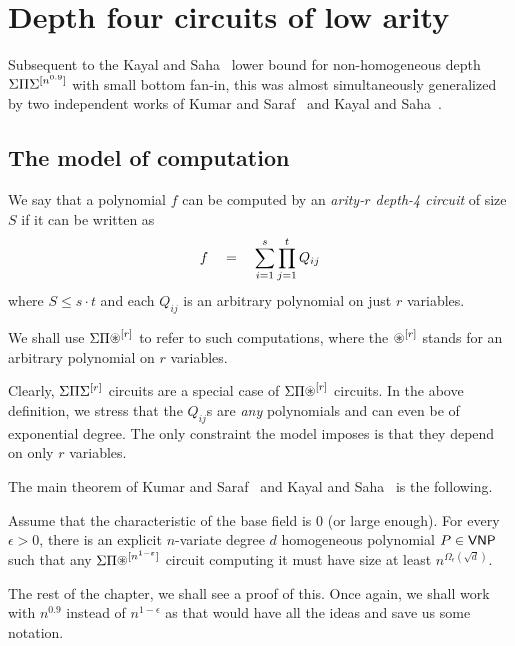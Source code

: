 \chapter{Depth four circuits of low arity}
\label{chap:d4lowarity}

Subsequent to the Kayal and Saha~\cite{KayalSaha14} lower bound for non-homogeneous depth $\Sigma\Pi\Sigma^{[n^{0.9}]}$ with small bottom fan-in, this was almost simultaneously generalized by two independent works of Kumar and Saraf~\cite{KumarSaraf15} and Kayal and Saha~\cite{KayalSaha15}.

\section{The model of computation}

\begin{definition} We say that a polynomial $f$ can be computed by an \emph{arity-$r$ depth-4 circuit} of size $S$ if it can be written as
\[
f \quad = \quad \sum_{i=1}^s \prod_{j=1}^t Q_{ij}
\]
where $S \leq s \cdot t$ and each $Q_{ij}$ is an arbitrary polynomial on just $r$ variables. 

We shall use $\SPA^{[r]}$ to refer to such computations, where the $\circast^{[r]}$ stands for an arbitrary polynomial on $r$ variables. 
\end{definition}

Clearly, $\Sigma\Pi\Sigma^{[r]}$ circuits are a special case of $\SPA^{[r]}$ circuits. In the above definition, we stress that the $Q_{ij}$s are \emph{any} polynomials and can even be of exponential degree. The only constraint the model imposes is that they depend on only $r$ variables. 

The main theorem of Kumar and Saraf~\cite{KumarSaraf15} and Kayal and Saha~\cite{KayalSaha15} is the following.

\begin{theorem}\label{thm:low-arity-lb} Assume that the characteristic of the base field is $0$ (or large enough). For every $\epsilon > 0$, there is an explicit $n$-variate degree $d$ homogeneous polynomial $P \in \mathsf{VNP}$ such that any $\SPA^{[n^{1-\epsilon}]}$ circuit computing it must have size at least $n^{\Omega_\epsilon(\sqrt{d})}$. 
\end{theorem}

The rest of the chapter, we shall see a proof of this. Once again, we shall work with $n^{0.9}$ instead of $n^{1-\epsilon}$ as that would have all the ideas and save us some notation. 

